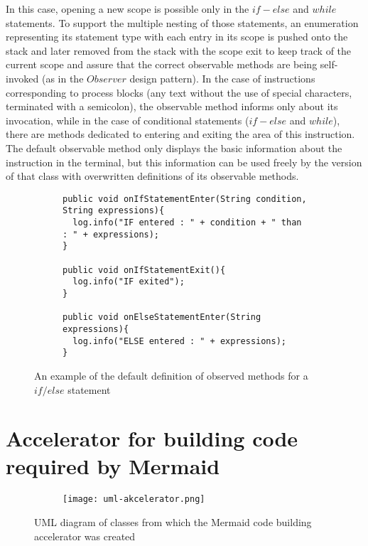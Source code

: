 In this case, opening a new scope is possible only in the $if - else$ and $while$ statements. To support the multiple nesting of those statements, an enumeration representing its statement type with each entry in its scope is pushed onto the stack and later removed from the stack with the scope exit to keep track of the current scope and assure that the correct observable methods are being self-invoked (as in the $Observer$ design pattern). In the case of instructions corresponding to process blocks (any text without the use of special characters, terminated with a semicolon), the observable method informs only about its invocation, while in the case of conditional statements ($if-else$ and $while$), there are methods dedicated to entering and exiting the area of this instruction. The default observable method only displays the basic information about the instruction in the terminal, but this information can be used freely by the version of that class with overwritten definitions of its observable methods. 
						
\begin{figure}[H]
  \begin{subfigure}{\textwidth}
		\begin{verbatim}
public void onIfStatementEnter(String condition, String expressions){
  log.info("IF entered : " + condition + " than : " + expressions);
}

public void onIfStatementExit(){
  log.info("IF exited");
}

public void onElseStatementEnter(String expressions){
  log.info("ELSE entered : " + expressions);
}
		\end{verbatim}
  \end{subfigure}\hfill
  \caption{An example of the default definition of observed methods for a $if/else$ statement}
\end{figure}



\section{Accelerator for building code required by Mermaid}

\begin{figure}[H]
  \begin{subfigure}{\textwidth}
  	\centering
    \texttt{[image: uml-akcelerator.png]}
  \end{subfigure}\hfill
  \caption{UML diagram of classes from which the Mermaid code building accelerator was created}
\end{figure}

